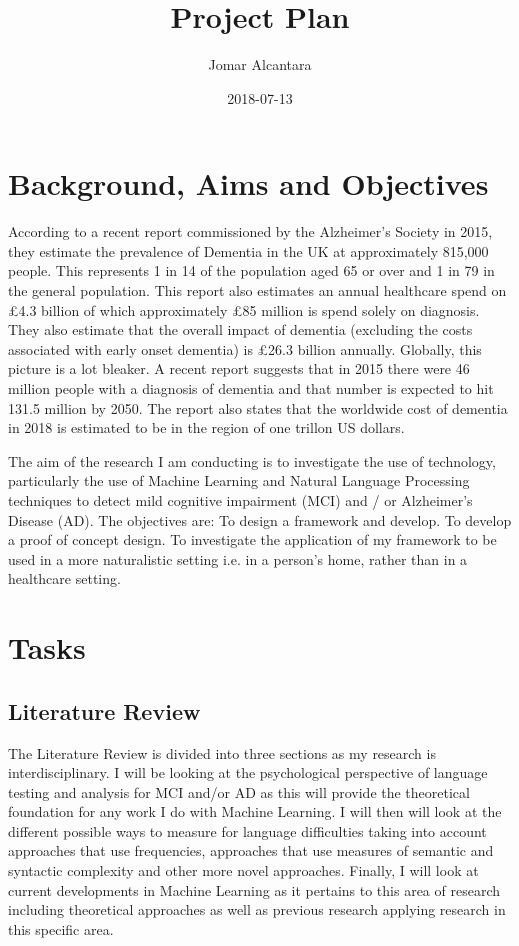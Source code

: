 \documentclass[a4paper]{article}
\title{Project Plan}
\date{2018-07-13}
\author{Jomar Alcantara}
\begin{document}
\maketitle
\section{Background, Aims and Objectives}
According to a recent report commissioned by the Alzheimer's Society in 2015, they estimate the prevalence of Dementia in the UK at approximately 815,000 people. This represents 1 in 14 of the population aged 65 or over and 1 in 79 in the general population. This report also estimates an annual healthcare spend on £4.3 billion of which approximately £85 million is spend solely on diagnosis. They also estimate that the overall impact of dementia (excluding the costs associated with early onset dementia) is £26.3 billion annually. Globally, this picture is a lot bleaker. A recent report suggests that in 2015 there were 46 million people with a diagnosis of dementia and that number is expected to hit 131.5 million by 2050. The report also states that the worldwide cost of dementia in 2018 is estimated to be in the region of one trillon US dollars.\newline
\par
The aim of the research I am conducting is to investigate the use of technology, particularly the use of Machine Learning and Natural Language Processing techniques to detect mild cognitive impairment (MCI) and / or Alzheimer's Disease (AD). The objectives are: To design a framework and develop. To develop a proof of concept design. To investigate the application of my framework to be used in a more naturalistic setting i.e. in a person's home, rather than in a healthcare setting. 
\section{Tasks}
\subsection{Literature Review}
The Literature Review is divided into three sections as my research is interdisciplinary. I will be looking at the psychological perspective of language testing and analysis for MCI and/or AD as this will provide the theoretical foundation for any work I do with Machine Learning. I will then will look at the different possible ways to measure for language difficulties taking into account approaches that use frequencies, approaches that use measures of semantic and syntactic complexity and other more novel approaches. Finally, I will look at current developments in Machine Learning as it pertains to this area of research including theoretical approaches as well as previous research applying research in this specific area.\newline
\par
\end{document}
